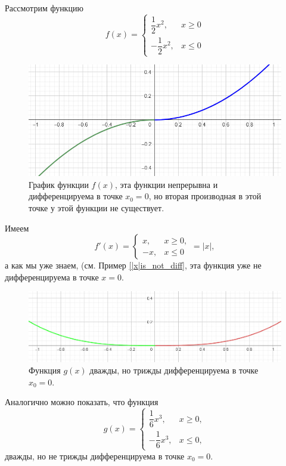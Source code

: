 \begin{example}
    Рассмотрим функцию 
    \[
     f(x) = \begin{cases}
         \dfrac{1}{2}x^2, & x \ge 0\\
         -\dfrac{1}{2}x^2, & x \le 0
         \end{cases}
    \]

\begin{figure}[h!]
    \centering
    \includegraphics[width=0.7\linewidth]{images/x^2.jpg}
    \caption{График функции $f(x)$, эта функции непрерывна и дифференцируема в точке $x_0=0$, но вторая производная в этой точке у этой функции не существует.}
    \label{fig:enter-label}
\end{figure}

Имеем
\[
 f'(x) = \begin{cases}
     x, & x \ge 0,\\
     -x, & x \le 0
 \end{cases} = |x|,
\]
а как мы уже знаем, (см. Пример \ref{|x|is_not_diff}, эта функция уже не дифференцируема в точке $x=0.$

\begin{figure}
    \centering
    \includegraphics[width=0.7\linewidth]{images/x^3.jpg}
    \caption{Функция $g(x)$ дважды, но трижды дифференцируема в точке $x_0=0$.}
    \label{fig:enter-label}
\end{figure}

Аналогично можно показать, что функция
\[
 g(x) = \begin{cases}
     \dfrac{1}{6} x^3, & x \ge 0,\\
     -\dfrac{1}{6} x^3, & x \le 0,
 \end{cases}
\]
дважды, но не трижды дифференцируема в точке $x_0=0$.
\end{example}


